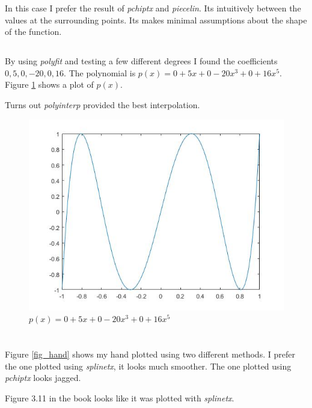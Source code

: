 \documentclass[12pt]{article}
\begin{document}
In this case I prefer the result of \textit{pchiptx} and \textit{piecelin}. Its intuitively between the values at the surrounding points. Its makes minimal assumptions about the shape of the function.

\subsection{}

By using \textit{polyfit} and testing a few different degrees I found the coefficients $0,5,0,-20,0,16$. The polynomial is $p(x) = 0+5x+0-20x^3+0+16x^5$. Figure \ref{fig_px} shows a plot of $p(x)$.

Turns out \textit{polyinterp} provided the best interpolation.

\begin{figure}
    \includegraphics[width=0.6\linewidth]{poly}
    \centering
    \caption{$p(x) = 0+5x+0-20x^3+0+16x^5$}
    \label{fig_px}
\end{figure}

\section{} %

Figure \ref{fig_hand} shows my hand plotted using two different methods. I prefer the one plotted using \textit{splinetx}, it looks much smoother. The one plotted using \textit{pchiptx} looks jagged.

Figure 3.11 in the book looks like it was plotted with \textit{splinetx}.
\end{document}

